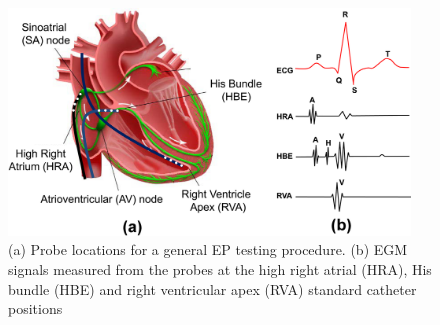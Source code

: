 \begin{figure}[!t]
\centering
		\includegraphics[width=0.95\textwidth]{figs/probes.png}
		
\caption{\small (a) Probe locations for a general EP testing procedure. (b) EGM signals measured from the probes at the high right atrial (HRA), His bundle (HBE) and right ventricular apex (RVA) standard catheter positions}
\label{fig:egm}
\end{figure} 

